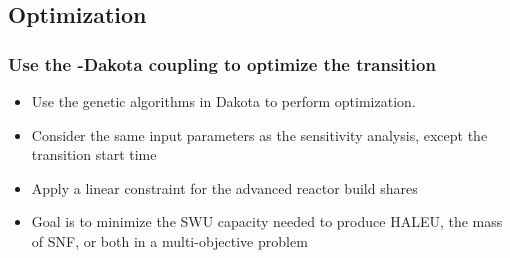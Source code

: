 \subsection{Optimization}
\begin{frame}
    \frametitle{Use the \Cyclus-Dakota coupling to optimize the transition}
    \begin{itemize}
        \item Use the genetic algorithms in Dakota to perform optimization.
        \item Consider the same input parameters as the sensitivity analysis, 
              except the transition start time
        \item<2-> Apply a linear constraint for the advanced reactor build shares
        \item<3-> Goal is to minimize the SWU capacity needed to 
             produce HALEU, the mass of SNF, or both in a multi-objective 
             problem
    \end{itemize}
\end{frame}

